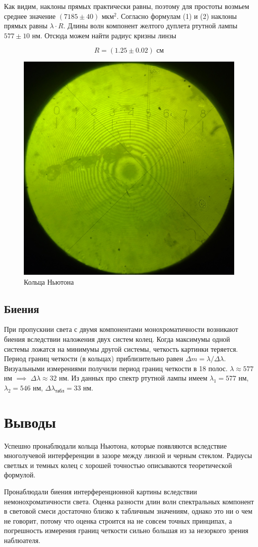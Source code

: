 \documentclass{article}
\begin{document}
Как видим, наклоны прямых практически равны, поэтому для простоты возмьем среднее
значение $(7185 \pm 40)$ мкм$^2$. Согласно формулам (1) и (2) наклоны прямых равны
$\lambda \cdot R$. Длины волн компонент желтого дуплета ртутной лампы $577 \pm 10$ нм.
Отсюда можем найти радиус кризны линзы

\begin{equation}
    R = (1.25 \pm 0.02) \text{ см}
\end{equation}

\newpage

\begin{figure}[h]
    \center\includegraphics[width = 0.6\linewidth]{rings.jpg}
    \caption{Кольца Ньютона}\label{fig:rings}
\end{figure}

\subsection{Биения}
При пропускнии света с двумя компонентами монохроматичности возникают биения вследствии
наложения двух систем колец. Когда максимумы одной системы ложатся на минимумы другой
системы, четкость картинки теряется. Период границ четкости (в кольцах) приблизительно
равен $\Delta m = \lambda / {\Delta \lambda}$. Визуальными измерениями получили период
границ четкости в 18 полос. $\lambda \approx 577$ нм $\implies$
$\Delta \lambda \approx 32$ нм. Из данных про спектр ртутной лампы имеем
$\lambda_1=577$ нм, $\lambda_2=546$ нм, $\Delta \lambda_{табл} = 33$ нм.

\section{Выводы}
Успешно пронаблюдали кольца Ньютона, которые появляются вследствие многолучевой
интерференции в зазоре между линзой и черным стеклом. Радиусы светлых и темных колец с
хорошей точностью описываются теоретической формулой.

Пронаблюдали биения интерференционной картины вследствии немонохроматичности света.
Оценка разности длин волн спектральных компонент в световой смеси достаточно близко
к табличным значениям, однако это ни о чем не говорит, потому что оценка строится
на не совсем точных принципах, а погрешность измерения границ четкости сильно большая
из за незоркого зрения наблюателя.
\end{document}
